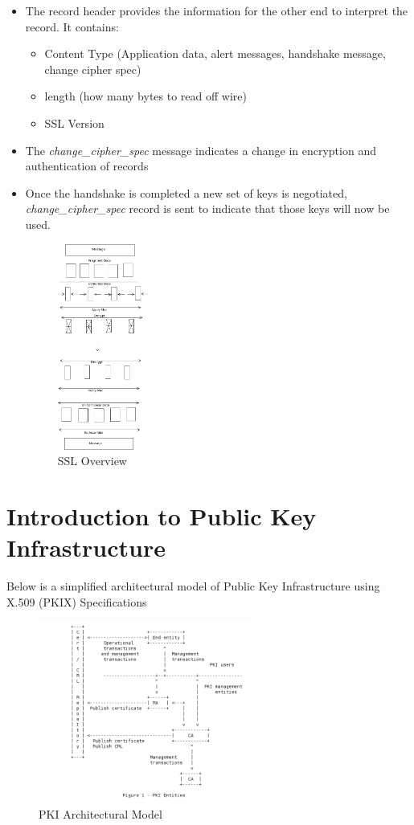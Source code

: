 \documentclass[12pt]{report}
\begin{document}
\begin{itemize}
\begin{itemize}
                \item The record header provides the information for the other end to interpret the record. It contains:
                    \begin{itemize}
                        \item Content Type (Application data, alert messages, handshake message, change cipher spec)
                        \item length  (how many bytes to read off wire)
                        \item SSL Version
                    \end{itemize}
                \item The \textit{change\_cipher\_spec} message indicates a change in encryption and authentication of records
                \item Once the handshake is completed a new set of keys is negotiated, \textit{change\_cipher\_spec} record is 
                    sent to indicate that those keys will now be used.
                    \begin{figure}[H]
                        \centering
                        \includegraphics[width=30mm]{Images/ssl-overview.png}
                        \caption{SSL Overview}
                    \end{figure}
            \end{itemize}
    \end{itemize}
\section{Introduction to Public Key Infrastructure}
Below is a simplified architectural model of Public Key Infrastructure using X.509 (PKIX) Specifications
\begin{figure}[ht!]
    \centering
    \includegraphics[width=70mm]{Images/pki-architectural-model.png}
    \caption{PKI Architectural Model ~\cite{5280}}
\end{figure}
\end{document}
